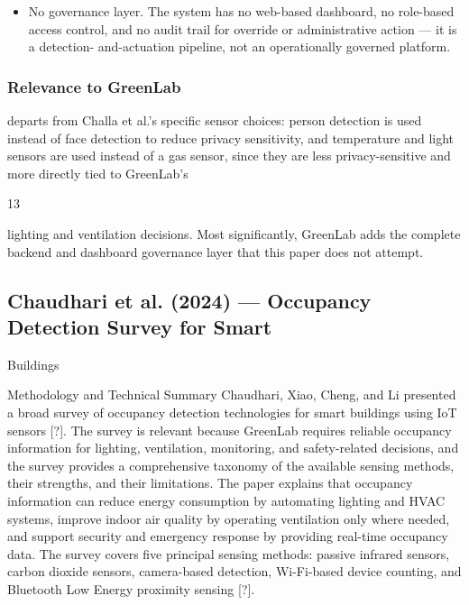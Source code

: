 \begin{itemize}
  \item No governance layer. The system has no web-based dashboard, no role-based access
control, and no audit trail for override or administrative action --- it is a detection-
and-actuation pipeline, not an operationally governed platform.
\end{itemize}



\subsubsection*{Relevance to GreenLab}

departs from Challa et al.'s speciﬁc sensor choices: person detection is used instead of face
detection to reduce privacy sensitivity, and temperature and light sensors are used instead
of a gas sensor, since they are less privacy-sensitive and more directly tied to GreenLab's

13


lighting and ventilation decisions. Most signiﬁcantly, GreenLab adds the complete backend
and dashboard governance layer that this paper does not attempt.



\subsection{Chaudhari et al. (2024) --- Occupancy Detection Survey for Smart}

Buildings

Methodology and Technical Summary Chaudhari, Xiao, Cheng, and Li presented a
broad survey of occupancy detection technologies for smart buildings using IoT sensors
[?]. The survey is relevant because GreenLab requires reliable occupancy information for
lighting, ventilation, monitoring, and safety-related decisions, and the survey provides a
comprehensive taxonomy of the available sensing methods, their strengths, and their limitations. The paper explains that occupancy information can reduce energy consumption by
automating lighting and HVAC systems, improve indoor air quality by operating ventilation
only where needed, and support security and emergency response by providing real-time
occupancy data. The survey covers ﬁve principal sensing methods: passive infrared sensors, carbon dioxide sensors, camera-based detection, Wi-Fi-based device counting, and
Bluetooth Low Energy proximity sensing [?].

